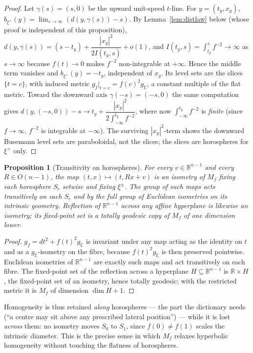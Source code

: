 \documentclass[11pt]{article}
\newtheorem{proposition}[theorem]{Proposition}
\theoremstyle{remark}
\newcommand{\R}{\mathbb{R}}
\newcommand{\Sb}[1]{S_{#1}}
\newcommand{\Mf}{M_{f}}
\newcommand{\E}{\mathbb{E}}
\begin{document}
\begin{proof}
Let $\gamma(s)=(s,0)$ be the upward unit-speed $t$-line. For
$y=(t_{y},x_{y})$, $b_{\xi^{+}}(y)=\lim_{s\to\infty}(d(y,\gamma(s))-s)$.
By Lemma~\ref{lem:distlaw} below (whose proof is independent of this
proposition),
$d(y,\gamma(s))=(s-t_{y})+\dfrac{|x_{y}|^{2}}{2I(t_{y},s)}+o(1)$, and
$I(t_{y},s)=\int_{t_{y}}^{s}f^{-2}\to\infty$ as $s\to\infty$ because
$f(t)\to0$ makes $f^{-2}$ non-integrable at $+\infty$. Hence the middle
term vanishes and $b_{\xi^{+}}(y)=-t_{y}$, independent of $x_{y}$. Its
level sets are the slices $\{t=c\}$, with induced metric
$g_{f}|_{t=c}=f(c)^{2}g_{\E}$, a constant multiple of the flat metric.
Toward the downward axis $\gamma(-s)=(-s,0)$ the same computation gives
$d(y,(-s,0))-s\to t_{y}+\dfrac{|x_{y}|^{2}}{2\int_{-\infty}^{t_{y}}
f^{-2}}$, where now $\int_{-\infty}^{t_{y}}f^{-2}$ is \emph{finite}
(since $f\to\infty$, $f^{-2}$ is integrable at $-\infty$). The
surviving $|x_{y}|^{2}$-term shows the downward Busemann level sets are
paraboloidal, not the slices; the slices are horospheres for $\xi^{+}$
only.
\end{proof}

\begin{proposition}[Transitivity on horospheres]\label{prop:mf-isom}
For every $v\in\R^{n-1}$ and every $R\in O(n-1)$, the map
$(t,x)\mapsto(t,Rx+v)$ is an isometry of $\Mf$ fixing each horosphere
$\Sb{c}$ setwise and fixing $\xi^{\pm}$. The group of such maps acts
transitively on each $\Sb{c}$ and by the full group of Euclidean
isometries on its intrinsic geometry. Reflection of $\R^{n-1}$ across
any affine hyperplane is likewise an isometry; its fixed-point set is a
totally geodesic copy of $\Mf$ of one dimension lower.
\end{proposition}

\begin{proof}
$g_{f}=dt^{2}+f(t)^{2}g_{\E}$ is invariant under any map acting as the
identity on $t$ and as a $g_{\E}$-isometry on the fibre, because
$f(t)^{2}g_{\E}$ is then preserved pointwise. Euclidean isometries of
$\R^{n-1}$ are exactly such maps and act transitively on each fibre.
The fixed-point set of the reflection across a hyperplane
$H\subseteq\R^{n-1}$ is $\R\times H$, the fixed-point set of an
isometry, hence totally geodesic; with the restricted metric it is
$M_{f}$ of dimension $\dim H+1$.
\end{proof}

Homogeneity is thus retained \emph{along} horospheres --- the part the
dictionary needs (``a centre may sit above any prescribed lateral
position'') --- while it is lost \emph{across} them: no isometry moves
$\Sb{0}$ to $\Sb{1}$, since $f(0)\neq f(1)$ scales the intrinsic
diameter. This is the precise sense in which $\Mf$ relaxes hyperbolic
homogeneity without touching the flatness of horospheres.
\end{document}
